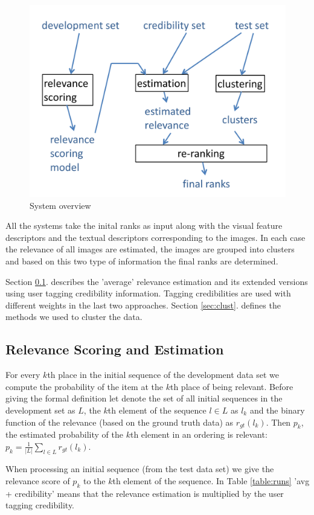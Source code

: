 \documentclass{acm_proc_article-me}
\begin{document}
\begin{figure}[t]
\centering
\includegraphics[width=0.8\linewidth]{BlockDiagram}
\caption{System overview}
\label{fig:block}
\end{figure}

All the systems take the inital ranks as input along with the visual feature descriptors and the textual descriptors corresponding to the images. In each case the relevance of all images are estimated, the images are grouped into clusters and based on this two type of information the final ranks are determined.

Section \ref{sec:relevance}. describes the 'average' relevance estimation and its extended versions using user tagging credibility information. Tagging credibilities are used with different weights in the last two approaches. Section \ref{sec:clust}. defines the methods we used to cluster the data.

\subsection{Relevance Scoring and Estimation}
\label{sec:relevance}

For every $k$th place in the initial sequence of the development data set we compute the probability of the item at the $k$th place of being relevant. Before giving the formal definition let denote the set of all initial sequences in the development set as $L$, the $k$th element of the sequence $l \in L$ as $l_k$ and the binary function of the relevance (based on the ground truth data) as $r_{gt}(l_k)$. Then $p_k$, the estimated probability of the $k$th element in an ordering is relevant:
$p_k = \frac{1}{|L|}\sum_{l \in L}r_{gt}(l_k)$.

When processing an initial sequence (from the test data set) we give the relevance score of $p_k$ to the $k$th element of the sequence. In Table \ref{table:runs} 'avg + credibility' means that the relevance estimation is multiplied by the user tagging credibility.
\end{document}
